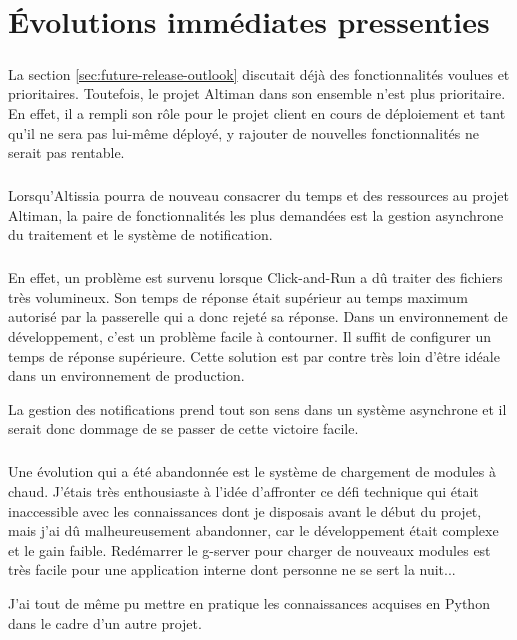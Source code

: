 \chapter{Évolutions immédiates pressenties}
\label{ch:next-steps}

\paragraph{}
La section \ref{sec:future-release-outlook} discutait déjà des fonctionnalités voulues et prioritaires.
Toutefois, le projet Altiman dans son ensemble n'est plus prioritaire.
En effet, il a rempli son rôle pour le projet client en cours de déploiement et tant qu'il ne sera pas lui-même déployé,
y rajouter de nouvelles fonctionnalités ne serait pas rentable.

\paragraph{}
Lorsqu'Altissia pourra de nouveau consacrer du temps et des ressources au projet Altiman,
la paire de fonctionnalités les plus demandées est la gestion asynchrone du traitement et le système de notification.

\paragraph{}
En effet, un problème est survenu lorsque Click-and-Run a dû traiter des fichiers très volumineux.
Son temps de réponse était supérieur au temps maximum autorisé par la passerelle qui a donc rejeté sa réponse.
Dans un environnement de développement, c'est un problème facile à contourner.
Il suffit de configurer un temps de réponse supérieure.
Cette solution est par contre très loin d'être idéale dans un environnement de production.

La gestion des notifications prend tout son sens dans un système asynchrone et il serait donc dommage de se passer de cette victoire facile.

\paragraph{}
Une évolution qui a été abandonnée est le système de chargement de modules à chaud.
J'étais très enthousiaste à l'idée d'affronter ce défi technique qui était inaccessible avec les connaissances dont je disposais avant le début du projet, mais j'ai dû malheureusement abandonner, car le développement était complexe et le gain faible.
Redémarrer le \gls{g-server} pour charger de nouveaux modules est très facile pour une application interne dont personne ne se sert la nuit...

J'ai tout de même pu mettre en pratique les connaissances acquises en Python dans le cadre d'un autre projet.
